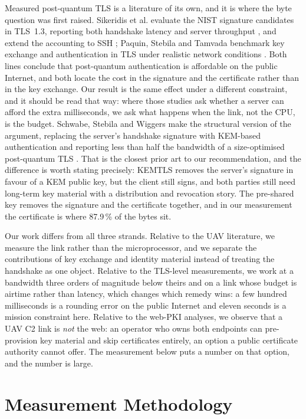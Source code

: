 \documentclass[drones,article,submit,pdftex,moreauthors]{Definitions/mdpi}
\newcommand{\tls}{TLS}
\begin{document}
Measured post-quantum \tls{} is a literature of its own, and it is where
the byte question was first raised. Sikeridis et al. evaluate the NIST
signature candidates in \tls{}~1.3, reporting both handshake latency and
server throughput \cite{sikeridis2020ndss}, and extend the accounting to
SSH \cite{sikeridis2020conext}; Paquin, Stebila and Tamvada benchmark key
exchange and authentication in \tls{} under realistic network conditions
\cite{paquin2020}. Both lines conclude that post-quantum authentication
is affordable on the public Internet, and both locate the cost in the
signature and the certificate rather than in the key exchange. Our result
is the same effect under a different constraint, and it should be read
that way: where those studies ask whether a server can afford the extra
milliseconds, we ask what happens when the link, not the CPU, is the
budget. Schwabe, Stebila and Wiggers make the structural version of the
argument, replacing the server's handshake signature with KEM-based
authentication and reporting less than half the bandwidth of a
size-optimised post-quantum \tls{} \cite{schwabe2020kemtls}. That is the
closest prior art to our recommendation, and the difference is worth
stating precisely: KEMTLS removes the server's signature in favour of a
KEM public key, but the client still signs, and both parties still need
long-term key material with a distribution and revocation story. The
pre-shared key removes the signature and the certificate together, and in
our measurement the certificate is where 87.9\,\% of the bytes sit.

Our work differs from all three strands. Relative to the UAV literature, we
measure the link rather than the microprocessor, and we separate the
contributions of key exchange and identity material instead of treating
the handshake as one object. Relative to the \tls{}-level measurements, we
work at a bandwidth three orders of magnitude below theirs and on a link
whose budget is airtime rather than latency, which changes which remedy
wins: a few hundred milliseconds is a rounding error on the public
Internet and eleven seconds is a mission constraint here. Relative to the
web-PKI analyses, we
observe that a UAV C2 link is \emph{not} the web: an operator who owns
both endpoints can pre-provision key material and skip certificates
entirely, an option a public certificate authority cannot offer. The
measurement below puts a number on that option, and the number is large.

\section{Measurement Methodology}
\label{sec:method}
\end{document}
